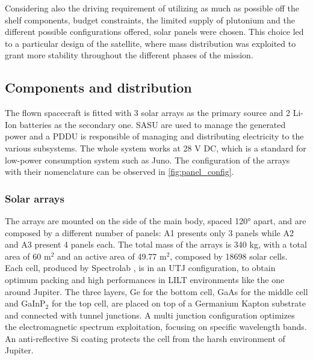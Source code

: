 Considering also the driving requirement of utilizing as much as possible off the shelf components, budget constraints, the limited supply of plutonium and the different possible configurations offered, solar panels were chosen. This choice led to a particular design of the satellite, where mass distribution was exploited to grant more stability throughout the different phases of the mission.  

\subsection{Components and distribution}
\label{subsec:components_and_distribution}

The flown spacecraft is fitted with 3 solar arrays as the primary source and 2 Li-Ion batteries as the secondary one. SASU are used to manage the generated power and a PDDU is responsible of managing and distributing electricity to the various subsystems.
The whole system works at 28 V DC, which is a standard for low-power consumption system such as Juno. The configuration of the arrays with their nomenclature can be observed in \autoref{fig:panel_config}.

\subsubsection{Solar arrays}
\label{susubsec:solar_arrays}

The arrays are mounted on the side of the main body, spaced 120° apart, and are composed by a different number of panels: A1 presents only 3 panels while A2 and A3 present 4 panels each. The total mass of the arrays is 340 kg, with a total area of 60 m$^2$ \cite{arrays_mass} and an active area of 49.77 m$^2$, composed by 18698 solar cells.\cite{masses_ref} 
Each cell, produced by Spectrolab \cite{solar_datasheet}, is in an UTJ configuration, to obtain optimum packing and high performances in LILT environments like the one around Jupiter. The three layers, Ge for the bottom cell, GaAs for the middle cell and GaInP$_2$ for the top cell, are placed on top of a Germanium Kapton substrate and connected with tunnel junctions. A multi junction configuration optimizes the electromagnetic spectrum exploitation, focusing on specific wavelength bands. An anti-reflective Si coating protects the cell from the harsh environment of Jupiter. 

